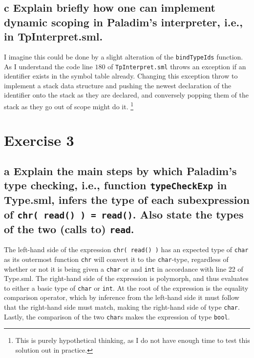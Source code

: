 \documentclass[11pt,a4paper]{article}
\begin{document}
\subsection*{c \mdseries Explain briefly how one can implement dynamic scoping
in Paladim's interpreter, i.e., in TpInterpret.sml.}
I imagine this could be done by a slight alteration of the {\tt bindTypeIds}
function. As I understand the code line $180$ of {\tt TpInterpret.sml} throws
an exception if an identifier exists in the symbol table already. Changing
this exception throw to implement a stack data structure and pushing the
newest declaration of the identifier onto the stack as they are declared, and
conversely popping them of the stack as they go out of scope might do it.
\footnote{This is purely hypothetical thinking, as I do not have enough time
to test this solution out in practice.}

\newpage
\section{Exercise 3}

\subsection*{a \mdseries Explain the main steps by which Paladim's type
checking, i.e., function {\tt typeCheckExp} in Type.sml, infers the type of
each subexpression of {\tt chr( read() ) = read()}. Also state the types of
the two (calls to) {\tt read}.}
The left-hand side of the expression {\tt chr( read() )} has an expected type
of {\tt char} as its outermost function {\tt chr} will convert it to the
{\tt char}-type, regardless of whether or not it is being given a {\tt char}
or and {\tt int} in accordance with line 22 of Type.sml. The right-hand side
of the expression is polymorph, and thus evaluates to either a basic type of
{\tt char} or {\tt int}. At the root of the expression is the equality
comparison operator, which by inference from the left-hand side it must follow
that the right-hand side must match, making the right-hand side of type
{\tt char}. Lastly, the comparison of the two {\tt char}s makes the expression
of type {\tt bool}.
\end{document}
